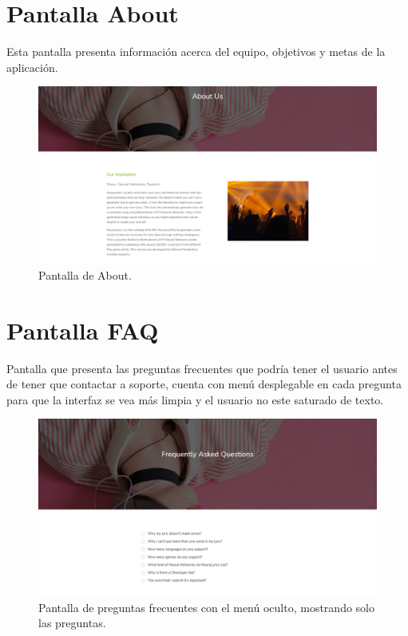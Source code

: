 \documentclass[12pt, a4paper, titlepage]{article}
\begin{document}
		\section{Pantalla About}
		Esta pantalla presenta información acerca del equipo, objetivos y metas de la aplicación.
		
		\begin{figure}[H] 
			\includegraphics[width=13.5cm]{./Imagenes/Capturas/pabout.png}
			\centering \caption{Pantalla de About.}
		\end{figure}
	
		\section{Pantalla FAQ}
		Pantalla que presenta las preguntas frecuentes que podría tener el usuario antes de tener que contactar a soporte, cuenta con menú desplegable en cada pregunta para que la interfaz se vea más limpia y el usuario no este saturado de texto.
		
		\begin{figure}[H] 
			\includegraphics[width=13.5cm]{./Imagenes/Capturas/pfaqclose.png}
			\centering \caption{Pantalla de preguntas frecuentes con el menú oculto, mostrando solo las preguntas.}
		\end{figure}
	
\end{document}
